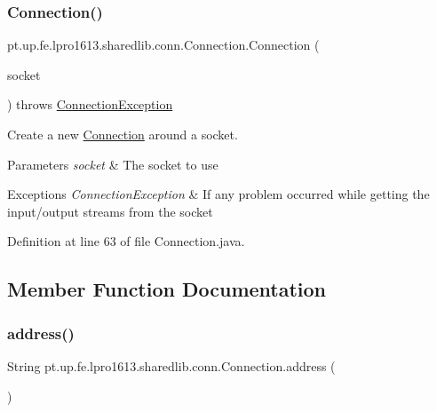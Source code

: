 \subsubsection{\texorpdfstring{Connection()}{Connection()}}
{\footnotesize\ttfamily pt.\+up.\+fe.\+lpro1613.\+sharedlib.\+conn.\+Connection.\+Connection (\begin{DoxyParamCaption}\item[{Socket}]{socket }\end{DoxyParamCaption}) throws \hyperlink{classpt_1_1up_1_1fe_1_1lpro1613_1_1sharedlib_1_1exceptions_1_1_connection_exception}{Connection\+Exception}}

Create a new \hyperlink{classpt_1_1up_1_1fe_1_1lpro1613_1_1sharedlib_1_1conn_1_1_connection}{Connection} around a socket.


\begin{DoxyParams}{Parameters}
{\em socket} & The socket to use \\
\hline
\end{DoxyParams}

\begin{DoxyExceptions}{Exceptions}
{\em Connection\+Exception} & If any problem occurred while getting the input/output streams from the socket \\
\hline
\end{DoxyExceptions}


Definition at line 63 of file Connection.\+java.



\subsection{Member Function Documentation}
\hypertarget{classpt_1_1up_1_1fe_1_1lpro1613_1_1sharedlib_1_1conn_1_1_connection_a58903a343693acbe946d4ad23eb29bd4}{}\label{classpt_1_1up_1_1fe_1_1lpro1613_1_1sharedlib_1_1conn_1_1_connection_a58903a343693acbe946d4ad23eb29bd4} 
\subsubsection{\texorpdfstring{address()}{address()}}
{\footnotesize\ttfamily String pt.\+up.\+fe.\+lpro1613.\+sharedlib.\+conn.\+Connection.\+address (\begin{DoxyParamCaption}{ }\end{DoxyParamCaption})}


